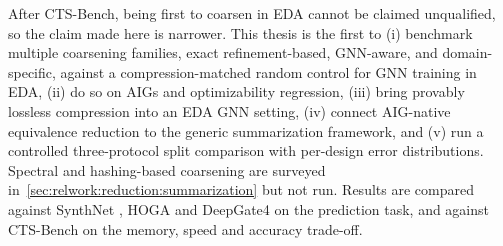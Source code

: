 After CTS-Bench, being first to coarsen in EDA cannot be claimed unqualified, so the claim
made here is narrower. This thesis is the first to (i) benchmark multiple coarsening
families, exact refinement-based, GNN-aware, and domain-specific, against a
compression-matched random control for GNN training in EDA, (ii) do so on AIGs and
optimizability regression, (iii) bring provably lossless compression into an EDA GNN
setting, (iv) connect AIG-native equivalence reduction to the generic summarization
framework, and (v) run a controlled three-protocol split comparison with per-design error
distributions. Spectral and hashing-based coarsening are surveyed
in~\ref{sec:relwork:reduction:summarization} but not run. Results are compared against
SynthNet \citep{chowdhury2021openabc}, HOGA \citep{deng2024hoga} and DeepGate4
\citep{deepgate4_2025} on the prediction task, and against CTS-Bench
\citep{cts_bench2026} on the memory, speed and accuracy trade-off.

